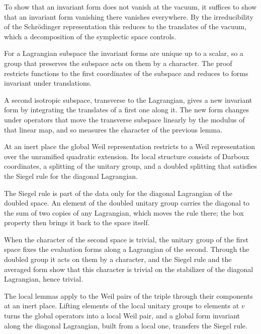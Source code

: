 To show that an invariant form does not vanish at the vacuum, it suffices to
show that an invariant form vanishing there vanishes everywhere. By the
irreducibility of the Schrödinger representation this reduces to the translates
of the vacuum, which a decomposition of the symplectic space controls.

For a Lagrangian subspace the invariant forms are unique up to a scalar, so a
group that preserves the subspace acts on them by a character. The proof
restricts functions to the first coordinates of the subspace and reduces to
forms invariant under translations.

A second isotropic subspace, transverse to the Lagrangian, gives a new
invariant form by integrating the translates of a first one along it. The new
form changes under operators that move the transverse subspace linearly by the
modulus of that linear map, and so measures the character of the previous lemma.

At an inert place the global Weil representation restricts to a Weil
representation over the unramified quadratic extension. Its local structure
consists of Darboux coordinates, a splitting of the unitary group, and a doubled
splitting that satisfies the Siegel rule for the diagonal Lagrangian.

The Siegel rule is part of the data only for the diagonal Lagrangian of the
doubled space. An element of the doubled unitary group carries the diagonal to
the sum of two copies of any Lagrangian, which moves the rule there; the box
property then brings it back to the space itself.

When the character of the second space is trivial, the unitary group of the
first space fixes the evaluation forms along a Lagrangian of the second. Through
the doubled group it acts on them by a character, and the Siegel rule and the
averaged form show that this character is trivial on the stabilizer of the
diagonal Lagrangian, hence trivial.

The local lemmas apply to the Weil pairs of the triple through their components
at an inert place. Lifting elements of the local unitary groups to elements at
$v$ turns the global operators into a local Weil pair, and a global form
invariant along the diagonal Lagrangian, built from a local one, transfers the
Siegel rule.

